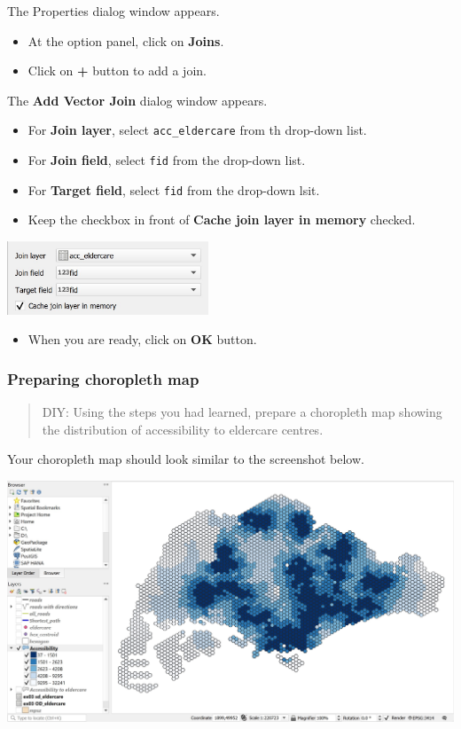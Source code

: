 \documentclass[
  letterpaper,
  DIV=11,
  numbers=noendperiod]{scrreprt}
\providecommand{\tightlist}{%
  \setlength{\itemsep}{0pt}\setlength{\parskip}{0pt}}\usepackage{longtable,booktabs,array}
\begin{document}
The Properties dialog window appears.

\begin{itemize}
\item
  At the option panel, click on \textbf{Joins}.
\item
  Click on \textbf{+} button to add a join.
\end{itemize}

The \textbf{Add Vector Join} dialog window appears.

\begin{itemize}
\item
  For \textbf{Join layer}, select \texttt{acc\_eldercare} from th
  drop-down list.
\item
  For \textbf{Join field}, select \texttt{fid} from the drop-down list.
\item
  For \textbf{Target field}, select \texttt{fid} from the drop-down
  lsit.
\item
  Keep the checkbox in front of \textbf{Cache join layer in memory}
  checked.
\end{itemize}

\includegraphics[width=0.45\textwidth,height=\textheight]{./img09/image36.jpg}

\begin{itemize}
\tightlist
\item
  When you are ready, click on \textbf{OK} button.
\end{itemize}

\hypertarget{preparing-choropleth-map}{%
\subsubsection{Preparing choropleth
map}\label{preparing-choropleth-map}}

\begin{quote}
DIY: Using the steps you had learned, prepare a choropleth map showing
the distribution of accessibility to eldercare centres.
\end{quote}

Your choropleth map should look similar to the screenshot below.

\includegraphics{./img09/image35.jpg}
\end{document}
